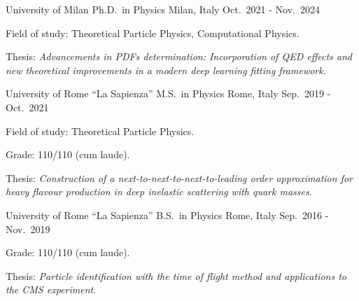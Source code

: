 

\begin{cventries}

    \cventry
        {University of Milan} %
        {Ph.D.\ in Physics} %
        {Milan, Italy} %
        {Oct.\ 2021 - Nov.\ 2024} %
        {
        \begin{cvitems} %
            \item Field of study: Theoretical Particle Physics, Computational Physics.
            \item Thesis: \emph{Advancements in PDFs determination: Incorporation of QED effects and new theoretical improvements in a modern deep learning fitting framework}.
        \end{cvitems}
        }

    \cventry
        {University of Rome ``La Sapienza''} %
        {M.S.\ in Physics} %
        {Rome, Italy} %
        {Sep.\ 2019 - Oct.\ 2021} %
        {
        \begin{cvitems} %
            \item Field of study: Theoretical Particle Physics.
            \item Grade: 110/110 (cum laude).
            \item Thesis: \emph{Construction of a next-to-next-to-next-to-leading order approximation for heavy flavour production in deep inelastic scattering with quark masses}. \href{https://inspirehep.net/literature/2750247}{\textcolor{awesome-red}{}}
        \end{cvitems}
        }

    \cventry
        {University of Rome ``La Sapienza''} %
        {B.S.\ in Physics} %
        {Rome, Italy} %
        {Sep.\ 2016 - Nov.\ 2019} %
        {
        \begin{cvitems} %
            \item Grade: 110/110 (cum laude).
            \item Thesis: \emph{Particle identification with the time of flight method and applications to the CMS experiment}.
        \end{cvitems}
        }

\end{cventries}